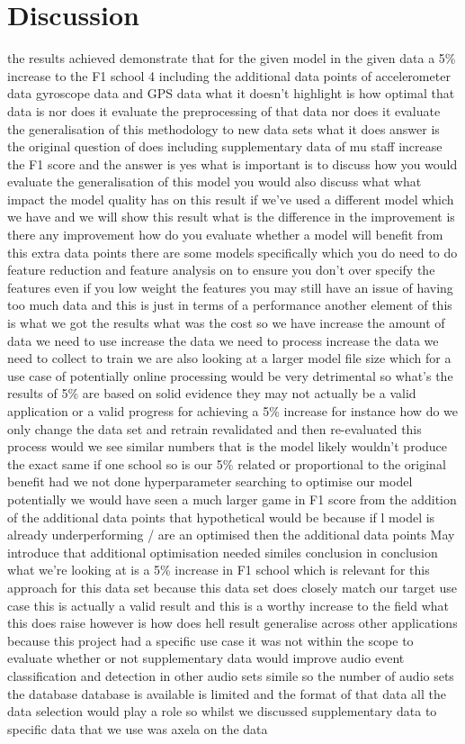 \documentclass{UoNMCHA}
\numberwithin{equation}{section}
\begin{document}
\section{Discussion}\label{sec:Discussion}
the results achieved demonstrate that for the given model in the given data a 5\% increase to the F1 school 4 including the additional data points of accelerometer data gyroscope data and GPS data what it doesn't highlight is how optimal that data is nor does it evaluate the preprocessing of that data nor does it evaluate the generalisation of this methodology to new data sets what it does answer is the original question of does including supplementary data of mu staff increase the F1 score and the answer is yes what is important is to discuss how you would evaluate the generalisation of this model you would also discuss what what impact the model quality has on this result if we've used a different model which we have and we will show this result what is the difference in the improvement is there any improvement how do you evaluate whether a model will benefit from this extra data points there are some models specifically which you do need to do feature reduction and feature analysis on to ensure you don't over specify the features even if you low weight the features you may still have an issue of having too much data and this is just in terms of a performance another element of this is what we got the results what was the cost so we have increase the amount of data we need to use increase the data we need to process increase the data we need to collect to train we are also looking at a larger model file size which for a use case of potentially online processing would be very detrimental so what's the results of 5\% are based on solid evidence they may not actually be a valid application or a valid progress for achieving a 5\% increase for instance how do we only change the data set and retrain revalidated and then re-evaluated this process would we see similar numbers that is the model likely wouldn't produce the exact same if one school so is our 5\% related or proportional to the original benefit had we not done hyperparameter searching to optimise our model potentially we would have seen a much larger game in F1 score from the addition of the additional data points that hypothetical would be because if l model is already underperforming / are an optimised then the additional data points May introduce that additional optimisation needed similes conclusion in conclusion what we're looking at is a 5\% increase in F1 school which is relevant for this approach for this data set because this data set does closely match our target use case this is actually a valid result and this is a worthy increase to the field what this does raise however is how does hell result generalise across other applications because this project had a specific use case it was not within the scope to evaluate whether or not supplementary data would improve audio event classification and detection in other audio sets simile so the number of audio sets the database database is available is limited and the format of that data all the data selection would play a role so whilst we discussed supplementary data to specific data that we use was axela on the data 
\end{document}
